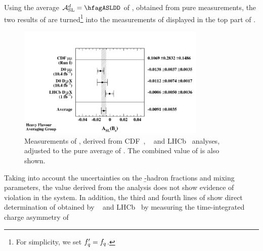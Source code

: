 Using the average $\ASLd = \hfagASLDD$ of ,
obtained from pure \Bd measurements,
the two results of 
are turned\footnote{
  \label{foot:life_mix:f'f}
  For simplicity, we set $f'_{q}=f_{q}$.} 
into the measurements of \ASLs displayed in the top part of .
\begin{figure}[t]
\begin{center}
\includegraphics[width=0.8\textwidth]{figures/life_mix/asls_bw}
\caption{Measurements of \ASLs,
derived from CDF~\cite{Abe:1996zt},
\dzero~\cite{Abazov:2013uma,*Abazov:2011yk_mod,*Abazov:2010hv_mod_cont,*Abazov:2010hj_mod_cont,*Abazov:2011yk_cont,Abazov:2012zz,*Abazov:2009wg_mod_cont,*Abazov:2007nw_mod_cont}
and LHCb~\cite{Aaij:2013gta}
analyses, adjusted to the pure \Bd 
average of \ASLd. 
The combined value of \ASLs is also shown.}
\end{center}
\end{figure}
Taking into account the uncertainties on
the \b-hadron fractions and mixing parameters, 
the value derived from the \dzero analysis does not show evidence
of \CP violation in the \Bs system.
In addition, the third and fourth lines of  show direct determination of \ASLs
obtained by \dzero~\cite{Abazov:2012zz,*Abazov:2009wg_mod_cont,*Abazov:2007nw_mod_cont}
and LHCb~\cite{Aaij:2013gta}
by measuring the time-integrated charge asymmetry of
